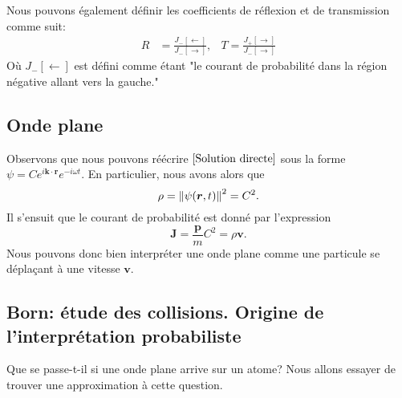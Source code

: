 \documentclass[../notesdecours]{subfiles}
\begin{document}
Nous pouvons également définir les coefficients de réflexion et de transmission comme suit:
\begin{align}
R &= \frac{J_- [\leftarrow]}{J_- [\rightarrow]},	&T = \frac{J_+ [\rightarrow]}{J_- [\rightarrow]}
\end{align}
Où $J_- [\leftarrow]$ est défini comme étant "le courant de probabilité dans la région négative allant vers la gauche."\\

\subsection{Onde plane}

Observons que nous pouvons réécrire $\eqref{Solution directe}$ sous la forme $\psi = Ce^{i \bm{k}\cdot\bm{r}}e^{-i\omega t}$. En particulier, nous avons alors que
\begin{equation}
    \rho = \norm{\psi(\bm{r},t)}^2 = C^2.
\end{equation}
Il s'ensuit que le courant de probabilité est donné par l'expression
\begin{equation}
    \bm{J} = \frac{\bm{p}}{m}C^2 = \rho\bm{v}.
\end{equation}
Nous pouvons donc bien interpréter une onde plane comme une particule se déplaçant à une vitesse $\bm{v}$.

\subsection{Born: étude des collisions. Origine de l'interprétation probabiliste}
Que se passe-t-il si une onde plane arrive sur un atome? Nous allons essayer de trouver une approximation à cette question.\\
\end{document}
